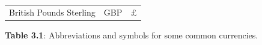 {\begin{center}
\begin{xtabular*}{\mytablewidth}[t]{|p{10\mystarwidth}|p{10\mystarwidth}|p{10\mystarwidth}|}
    
        British Pounds Sterling &
    
    
        GBP &
    
    
        £%
     \tabularnewline{}
    \end{xtabular*}
      \end{center}
    \begin{center}{\small\bfseries Table 3.1}: Abbreviations and symbols for some common currencies.\end{center}
    
    \addtocounter{footnote}{-0}
    
        }%
      
    \par
  
